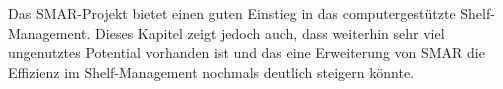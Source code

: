 Das \ac{SMAR}-Projekt bietet einen guten Einstieg in das computergestützte Shelf-Management. Dieses Kapitel zeigt jedoch auch, dass weiterhin sehr viel ungenutztes Potential vorhanden ist und das eine Erweiterung von \ac{SMAR} die Effizienz im Shelf-Management nochmals deutlich steigern könnte.
%

